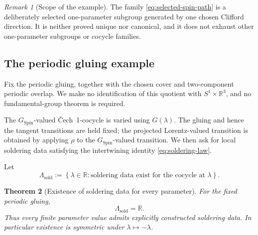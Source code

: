 \documentclass[11pt,a4paper]{article}
\newtheorem{theorem}{Theorem}[section]
\theoremstyle{definition}
\theoremstyle{remark}
\newtheorem{remark}[theorem]{Remark}
\newcommand{\R}{\mathbb{R}}
\newcommand{\SpinG}{G_{\mathrm{Spin}}}
\newcommand{\Cech}{\ifmmode\text{\v{C}ech}\else\v{C}ech\fi}
\begin{document}
\begin{remark}[Scope of the example]
\label{bdry:selected}
The family \eqref{eq:selected-spin-path} is a deliberately selected one-parameter subgroup
generated by one chosen Clifford direction.  It is neither proved unique
nor canonical, and it does not exhaust other one-parameter subgroups or cocycle families.
\end{remark}

\subsection{The periodic gluing example}

Fix the periodic gluing, together with the chosen cover and two-component periodic overlap.  We make no identification of
this quotient with \(S^{1}\times\R^{3}\), and no fundamental-group theorem
is required.

The \(\SpinG\)-valued \Cech\ 1-cocycle is varied using \(G(\lambda)\).
The gluing and hence the tangent transitions are held fixed; the
projected Lorentz-valued transition is obtained by applying \(\rho\) to the \(\SpinG\)-valued transition.  We then ask for local soldering data satisfying the intertwining identity \eqref{eq:soldering-law}.

Let
\[
  \Lambda_{\mathrm{sold}}
  :=
  \left\{
      \lambda\in\R:
      \text{soldering data exist for the cocycle at }\lambda
  \right\}.
\tag{11.5}
\]

\begin{theorem}[Existence of soldering data for every parameter]
\label{thm:admissibility}
For the fixed periodic gluing,
\[
   \Lambda_{\mathrm{sold}}=\R.
\tag{11.6}\label{eq:admissibility-region}
\]
Thus every finite parameter value admits explicitly constructed soldering data.  In particular existence is symmetric under
\(\lambda\mapsto-\lambda\).
\end{theorem}
\end{document}
